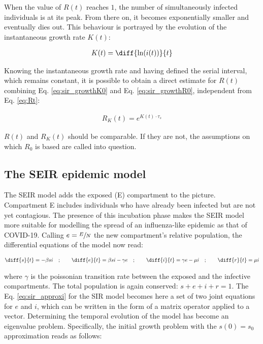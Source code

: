 \documentclass[DIV=12, BCOR=0pt]{scrartcl}  %
\begin{document}
  When the value of $R(t)$ reaches $1$, the number of simultaneously infected individuals is at its peak. From there on, it becomes exponentially smaller and eventually dies out. 
  This behaviour is portrayed by the evolution of the instantaneous growth rate $K(t)$:
  
  \begin{align}
  	K(t) =  \diff{\ln(i(t))}{t} %
  	\label{eq:Kt}
  \end{align}

	Knowing the instantaneous growth rate and having defined the serial interval, which remains constant, it is possible to obtain a direct estimate for $R(t)$ combining Eq. \ref{eq:sir_growthK0} and Eq. \ref{eq:sir_growthR0}, independent from Eq. \ref{eq:Rt}:

  \begin{align}
  	R_K(t) = e^{K(t) \cdot \tau_s}
  	\label{eq:RKt}
  \end{align}

	$R(t)$ and $R_K(t)$ should be comparable. If they are not, the assumptions on which $R_0$ is based are called into question.
  
  
  \subsection{The SEIR epidemic model}
  The SEIR model adds the exposed (E) compartment to the picture. Compartment E includes individuals who have already been infected but are not yet contagious. The presence of this incubation phase makes the SEIR model more suitable for modelling the spread of an influenza-like epidemic as that of COVID-19. 
  Calling $e = \sfrac{E}{N}$ the new compartment's relative population, the differential equations of the model now read:
  
  \begin{align}
  	\diff{s}{t} = - \beta s i \quad;  \qquad 	\diff{e}{t} = \beta s i - \gamma e \quad; \qquad \diff{i}{t} = \gamma e - \mu i \quad; \qquad \diff{r}{t} = \mu i
  	\label{eq:seir}
  \end{align}

   where $\gamma$ is the poissonian transition rate between the exposed and the infective compartments. The total population is again conserved: $ s + e + i + r = 1$. 
  The Eq. \ref{eq:sir_approxi} for the SIR model becomes here a set of two joint equations for $e$ and $i$, which can be written in the form of a matrix operator applied to a vector. Determining the temporal evolution of the model has become an eigenvalue problem. Specifically, the initial growth problem with the $s(0) = s_0$ approximation reads as follows: 
  
\end{document}
